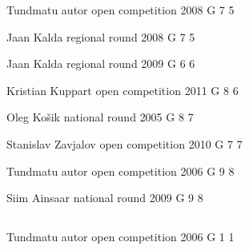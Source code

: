 \documentclass[11pt]{article}
\begin{document}
\ylDisplay{} %
{Tundmatu autor} %
{open competition} %
{2008} %
{G 7} %
{5} %
{

\ifEngStatement
\fi
}

\ylDisplay{} %
{Jaan Kalda} %
{regional round} %
{2008} %
{G 7} %
{5} %
{

\ifEngStatement
\fi
}

\ylDisplay{} %
{Jaan Kalda} %
{regional round} %
{2009} %
{G 6} %
{6} %
{

\ifEngStatement
\fi
}

\ylDisplay{} %
{Kristian Kuppart} %
{open competition} %
{2011} %
{G 8} %
{6} %
{

\ifEngStatement
\fi
}

\ylDisplay{} %
{Oleg Košik} %
{national round} %
{2005} %
{G 8} %
{7} %
{

\ifEngStatement
\fi
}

\ylDisplay{} %
{Stanislav Zavjalov} %
{open competition} %
{2010} %
{G 7} %
{7} %
{

\ifEngStatement
\fi
}

\ylDisplay{} %
{Tundmatu autor} %
{open competition} %
{2006} %
{G 9} %
{8} %
{

\ifEngStatement
\fi
}

\ylDisplay{} %
{Siim Ainsaar} %
{national round} %
{2009} %
{G 9} %
{8} %
{

\ifEngStatement
\fi
}
\newpage\subsection{\protect{}}

\ylDisplay{} %
{Tundmatu autor} %
{open competition} %
{2006} %
{G 1} %
{1} %
{

\ifEngStatement
\fi
}
\end{document}

